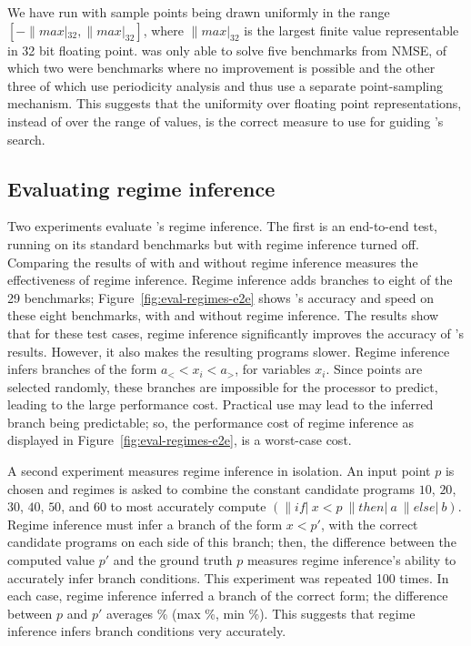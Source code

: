 \documentclass[paper.tex]{subfiles}
\begin{document}
We have run \casio with sample points being drawn
  uniformly in the range $[-\|max|_{32}, \|max|_{32}]$,
  where $\|max|_{32}$ is the largest finite value
  representable in 32 bit floating point.
\casio was only able to solve five benchmarks from NMSE,
  of which two were benchmarks where no improvement is possible
  and the other three of which use periodicity analysis
  and thus use a separate point-sampling mechanism.
This suggests that the uniformity over floating point representations,
  instead of over the range of values,
  is the correct measure to use for guiding \casio's search.

\subsection{Evaluating regime inference} \label{sec:eval-regimes}

Two experiments evaluate \casio's regime inference.
The first is an end-to-end test,
  running \casio on its standard benchmarks but with regime inference turned off.
Comparing the results of \casio with and without regime inference
  measures the effectiveness of regime inference.
Regime inference adds branches to eight of the 29 benchmarks;
  Figure~\ref{fig:eval-regimes-e2e} shows
  \casio's accuracy and speed on these eight benchmarks,
  with and without regime inference.
The results show that for these test cases, regime inference
  significantly improves the accuracy of \casio's results.
However, it also makes the resulting programs slower.
Regime inference infers branches of the form $a_< < x_i < a_>$,
  for variables $x_i$.
Since points are selected randomly, these branches are
  impossible for the processor to predict,
  leading to the large performance cost.
Practical use may lead to the inferred branch being predictable;
  so, the performance cost of regime inference
  as displayed in Figure~\ref{fig:eval-regimes-e2e},
  is a worst-case cost.

A second experiment measures regime inference in isolation.
An input point $p$ is chosen
  and regimes is asked to combine the constant candidate programs
  $10$, $20$, $30$, $40$, $50$, and $60$
  to most accurately compute $(\|if|\:x < p\:\|then|\:a\:\|else|\:b)$.
Regime inference must infer a branch of the form $x < p'$,
  with the correct candidate programs on each side of this branch;
  then, the difference between the computed value $p'$ and the ground truth $p$
  measures regime inference's ability to accurately infer branch conditions.
This experiment was repeated 100 times.
In each case, regime inference inferred a branch of the correct form;
  the difference between $p$ and $p'$ averages \%
  (max \%, min \%).
This suggests that regime inference infers branch conditions
  very accurately.
\end{document}
